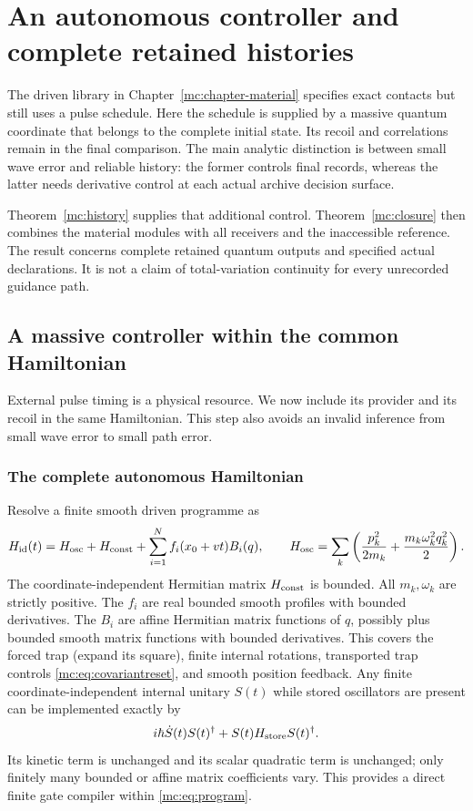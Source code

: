 \documentclass[11pt,oneside,openany]{book}
\theoremstyle{definition}
\theoremstyle{remark}\newtheorem{remark}[theorem]{Remark}
\begin{document}
\chapter{An autonomous controller and complete retained histories}
\label{mc:chapter-autonomous}

The driven library in Chapter~\ref{mc:chapter-material} specifies exact
contacts but still uses a pulse schedule. Here the schedule is supplied by
a massive quantum coordinate that belongs to the complete initial state.
Its recoil and correlations remain in the final comparison. The main
analytic distinction is between small wave error and reliable history:
the former controls final records, whereas the latter needs derivative
control at each actual archive decision surface.

Theorem~\ref{mc:history} supplies that additional control.
Theorem~\ref{mc:closure} then combines the material modules with all
receivers and the inaccessible reference. The result concerns complete
retained quantum outputs and specified actual declarations. It is not a
claim of total-variation continuity for every unrecorded guidance path.

\section{A massive controller within the common Hamiltonian}
\label{mc:sec:clock}
External pulse timing is a physical resource. We now include its provider and its recoil in the same Hamiltonian. This step also avoids an invalid inference from small wave error to small path error.

\subsection{The complete autonomous Hamiltonian}
Resolve a finite smooth driven programme as
\begin{equation}\label{mc:eq:program}
 H_{\rm id}(t)=H_{\rm osc}+H_{\rm const}+\sum_{i=1}^N f_i(x_0+vt)B_i(q),
 \qquad H_{\rm osc}=\sum_k\left(\frac{p_k^2}{2m_k}
                         +\frac{m_k\omega_k^2q_k^2}{2}\right).
\end{equation}
The coordinate-independent Hermitian matrix $H_{\rm const}$ is bounded. All $m_k,\omega_k$ are strictly positive. The $f_i$ are real bounded smooth profiles with bounded derivatives. The $B_i$ are affine Hermitian matrix functions of $q$, possibly plus bounded smooth matrix functions with bounded derivatives. This covers the forced trap (expand its square), finite internal rotations, transported trap controls \eqref{mc:eq:covariantreset}, and smooth position feedback. Any finite coordinate-independent internal unitary $S(t)$ while stored oscillators are present can be implemented exactly by
\[
 i\hbar\dot S(t)S(t)^\dagger+S(t)H_{\rm store}S(t)^\dagger.
\]
Its kinetic term is unchanged and its scalar quadratic term is unchanged; only finitely many bounded or affine matrix coefficients vary. This provides a direct finite gate compiler within \eqref{mc:eq:program}.
\end{document}
